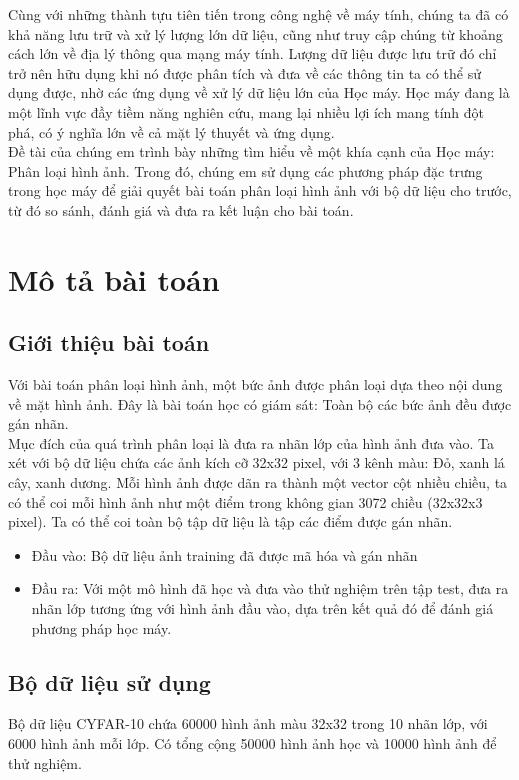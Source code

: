 \documentclass[a4paper,12pt]{report}
\begin{document}
Cùng với những thành tựu tiên tiến trong công nghệ về máy tính, chúng ta đã có khả năng lưu trữ và xử lý lượng lớn dữ liệu, cũng như truy cập chúng từ khoảng cách lớn về địa lý thông qua mạng máy tính. Lượng dữ liệu được lưu trữ đó chỉ trở nên hữu dụng khi nó được phân tích và đưa về các thông tin ta có thể sử dụng được, nhờ các ứng dụng về xử lý dữ liệu lớn của Học máy. Học máy đang là một lĩnh vực đầy tiềm năng nghiên cứu, mang lại nhiều lợi ích mang tính đột phá, có ý nghĩa lớn về cả mặt lý thuyết và ứng dụng. \\

Đề tài của chúng em trình bày những tìm hiểu về một khía cạnh của Học máy: Phân loại hình ảnh. Trong đó, chúng em sử dụng các phương pháp đặc trưng trong học máy để giải quyết bài toán phân loại hình ảnh với bộ dữ liệu cho trước, từ đó so sánh, đánh giá và đưa ra kết luận cho bài toán. 
\chapter{Mô tả bài toán}
\section{Giới thiệu bài toán}
Với bài toán phân loại hình ảnh, một bức ảnh được phân loại dựa theo nội dung về mặt hình ảnh. Đây là bài toán học có giám sát: Toàn bộ các bức ảnh đều được gán nhãn. \\

Mục đích của quá trình phân loại là đưa ra nhãn lớp của hình ảnh đưa vào. Ta xét với bộ dữ liệu chứa các ảnh kích cỡ 32x32 pixel, với 3 kênh màu: Đỏ, xanh lá cây, xanh dương. Mỗi hình ảnh được dãn ra thành một vector cột nhiều chiều, ta có thể coi mỗi hình ảnh như một điểm trong không gian 3072 chiều (32x32x3 pixel). Ta có thể coi toàn bộ tập dữ liệu là tập các điểm được gán nhãn. 

\begin{itemize}
\item Đầu vào: Bộ dữ liệu ảnh training đã được mã hóa và gán nhãn
\end{itemize} 
\begin{itemize}
\item Đầu ra: Với một mô hình đã học và đưa vào thử nghiệm trên tập test, đưa ra nhãn lớp tương ứng với hình ảnh đầu vào, dựa trên kết quả đó để đánh giá phương pháp học máy.
\end{itemize}
\section{Bộ dữ liệu sử dụng}
Bộ dữ liệu CYFAR-10 chứa 60000 hình ảnh màu 32x32 trong 10 nhãn lớp, với 6000 hình ảnh mỗi lớp. Có tổng cộng 50000 hình ảnh học và 10000 hình ảnh để thử nghiệm.\\
\end{document}
